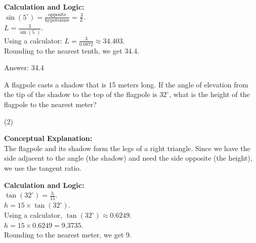 \documentclass[11pt,paper=a4,answers]{exam}
\begin{document}
\begin{questions}
\begin{solution}
\vspace{10pt}
\textbf{Calculation and Logic:} \\
$\sin(5^\circ) = \frac{\text{opposite}}{\text{hypotenuse}} = \frac{3}{L}$. \\
$L = \frac{3}{\sin(5^\circ)}$. \\
Using a calculator: $L = \frac{3}{0.0872} \approx 34.403$. \\
Rounding to the nearest tenth, we get 34.4.

\vspace{15pt}
Answer: \colorbox{yellow!100}{34.4}
\end{solution}


\question
A flagpole casts a shadow that is 15 meters long. If the angle of elevation from the tip of the shadow to the top of the flagpole is $32^\circ$, what is the height of the flagpole to the nearest meter?
\begin{center}
\end{center}
\begin{tasks}(2)
\end{tasks}

\begin{solution}
\textbf{Conceptual Explanation:} \\
The flagpole and its shadow form the legs of a right triangle. Since we have the side adjacent to the angle (the shadow) and need the side opposite (the height), we use the tangent ratio.

\vspace{10pt}
\textbf{Calculation and Logic:} \\
$\tan(32^\circ) = \frac{h}{15}$. \\
$h = 15 \times \tan(32^\circ)$. \\
Using a calculator, $\tan(32^\circ) \approx 0.6249$. \\
$h = 15 \times 0.6249 = 9.3735$. \\
Rounding to the nearest meter, we get 9.


\end{solution}
\end{questions}
\end{document}
